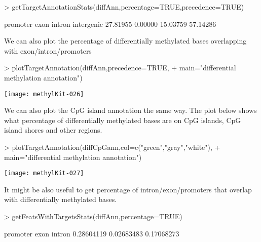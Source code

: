 \documentclass{article}
\begin{document}
\begin{Schunk}
\begin{Sinput}
> getTargetAnnotationStats(diffAnn,percentage=TRUE,precedence=TRUE)
\end{Sinput}
\begin{Soutput}
  promoter       exon     intron intergenic 
  27.81955    0.00000   15.03759   57.14286 
\end{Soutput}
\end{Schunk}

We can also plot the percentage of differentially methylated bases overlapping with exon/intron/promoters

\begin{center}
\begin{Schunk}
\begin{Sinput}
> plotTargetAnnotation(diffAnn,precedence=TRUE,
+     main="differential methylation annotation")
\end{Sinput}
\end{Schunk}
\texttt{[image: methylKit-026]}
\end{center}

We can also plot the CpG island annotation the same way. The plot below shows what percentage of differentially methylated bases are on CpG islands, CpG island shores and other regions.

\begin{center}
\begin{Schunk}
\begin{Sinput}
> plotTargetAnnotation(diffCpGann,col=c("green","gray","white"),
+        main="differential methylation annotation")
\end{Sinput}
\end{Schunk}
\texttt{[image: methylKit-027]}
\end{center}

It might be also useful to get percentage of intron/exon/promoters that overlap with differentially methylated bases.

\begin{Schunk}
\begin{Sinput}
> getFeatsWithTargetsStats(diffAnn,percentage=TRUE)
\end{Sinput}
\begin{Soutput}
  promoter       exon     intron 
0.28604119 0.02683483 0.17068273 
\end{Soutput}
\end{Schunk}
\end{document}
